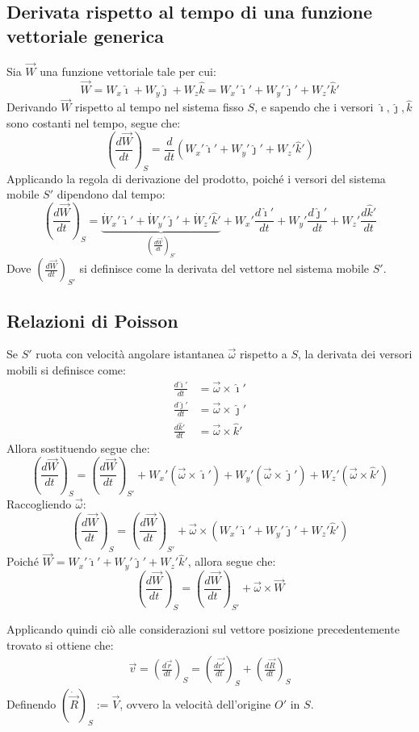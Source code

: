 \documentclass[11pt, a4paper, openright]{book}
\theoremstyle{plain}
\theoremstyle{definition}
\begin{document}
\subsection{Derivata rispetto al tempo di una funzione vettoriale generica}
Sia $\vec{W}$ una funzione vettoriale tale per cui:
\[\vec{W} = W_x\hat{\imath} + W_y\hat{\jmath} + W_z\hat{k} = W_x'\hat{\imath}' + W_y'\hat{\jmath}' + W_z'\hat{k}'\]
Derivando $\vec{W}$ rispetto al tempo nel sistema fisso $S$, e sapendo che i versori $\hat{\imath}, \hat{\jmath}, \hat{k}$ sono costanti nel tempo, segue che:
\[
\left(\frac{d\vec{W}}{dt}\right)_S = \frac{d}{dt}\left(W_x'\hat{\imath}' + W_y'\hat{\jmath}' + W_z'\hat{k}'\right)
\]
Applicando la regola di derivazione del prodotto, poiché i versori del sistema mobile $S'$ dipendono dal tempo:
\[
\left(\frac{d\vec{W}}{dt}\right)_S = \underbrace{\dot{W}_x'\hat{\imath}' + \dot{W}_y'\hat{\jmath}' + \dot{W}_z'\hat{k}'}_{\displaystyle \left(\frac{d\vec{W}}{dt}\right)_{S'}} + W_x'\frac{d\hat{\imath}'}{dt} + W_y'\frac{d\hat{\jmath}'}{dt} + W_z'\frac{d\hat{k}'}{dt}
\]
Dove $\left(\frac{d\vec{W}}{dt}\right)_{S'}$ si definisce come la derivata del vettore nel sistema mobile $S'$.

\subsection{Relazioni di Poisson}
Se $S'$ ruota con velocità angolare istantanea $\vec{\omega}$ rispetto a $S$, la derivata dei versori mobili si definisce come:
\begin{align}
\frac{d\hat{\imath}'}{dt} &= \vec{\omega} \times \hat{\imath}' \\
\frac{d\hat{\jmath}'}{dt} &= \vec{\omega} \times \hat{\jmath}' \\
\frac{d\hat{k}'}{dt} &= \vec{\omega} \times \hat{k}'
\end{align}
Allora sostituendo segue che:
\[
\left(\frac{d\vec{W}}{dt}\right)_S = \left(\frac{d\vec{W}}{dt}\right)_{S'} + W_x'(\vec{\omega} \times \hat{\imath}') + W_y'(\vec{\omega} \times \hat{\jmath}') + W_z'(\vec{\omega} \times \hat{k}')
\]
Raccogliendo $\vec{\omega}$:
\[
\left(\frac{d\vec{W}}{dt}\right)_S = \left(\frac{d\vec{W}}{dt}\right)_{S'} + \vec{\omega} \times (W_x'\hat{\imath}' + W_y'\hat{\jmath}' + W_z'\hat{k}')
\]
Poiché $\vec{W} = W_x'\hat{\imath}' + W_y'\hat{\jmath}' + W_z'\hat{k}'$, allora segue che:
\[
\left(\frac{d\vec{W}}{dt}\right)_S = \left(\frac{d\vec{W}}{dt}\right)_{S'} + \vec{\omega} \times \vec{W}
\]


Applicando quindi ciò alle considerazioni sul vettore posizione precedentemente trovato si ottiene che:
\begin{align}
    \vec{v} = \left(\frac{d\vec{r}}{dt}\right)_S = \left(\frac{d\vec{r'}}{dt}\right)_S + \left(\frac{d\vec{R}}{dt}\right)_S
\end{align}
Definendo $(\dot{\vec{R}})_S := \vec{V}$, ovvero la velocità dell'origine $O'$ in $S$. 
\end{document}
